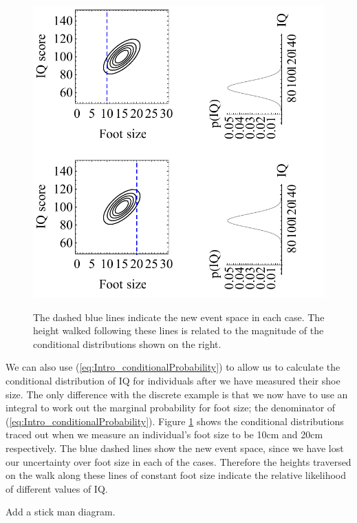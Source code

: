 \documentclass[11pt,fullpage]{book}
\begin{document}
\begin{figure}
\centering
\scalebox{0.5} 
{\includegraphics{Intro_footSizeIntelligenceConditional.pdf}}
\caption{The dashed blue lines indicate the new event space in each case. The height walked following these lines is related to the magnitude of the conditional distributions shown on the right.}\label{fig:Intro_footSizeIntelligenceConditional}
\end{figure}

We can also use (\ref{eq:Intro_conditionalProbability}) to allow us to calculate the conditional distribution of IQ for individuals after we have measured their shoe size. The only difference with the discrete example is that we now have to use an integral to work out the marginal probability for foot size; the denominator of (\ref{eq:Intro_conditionalProbability}). Figure \ref{fig:Intro_footSizeIntelligenceConditional} shows the conditional distributions traced out when we measure an individual's foot size to be 10cm and 20cm respectively. The blue dashed lines show the new event space, since we have lost our uncertainty over foot size in each of the cases. Therefore the heights traversed on the walk along these lines of constant foot size indicate the relative likelihood of different values of IQ. 

Add a stick man diagram.
\end{document}
